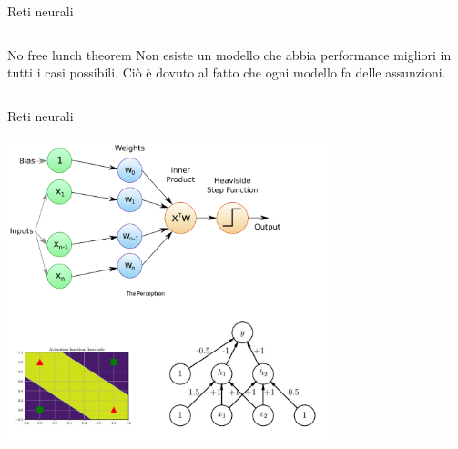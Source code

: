 \documentclass[11pt]{beamer}
\begin{document}
\begin{frame}{Reti neurali \cite{pml1Book,pml2Book,classification,regression}}
\begin{columns}
\begin{column}{0.4\textwidth}
\begin{center}
\end{center}
\begin{alertblock}{No free lunch theorem}
Non esiste un modello che abbia performance migliori in tutti i casi possibili. Ciò è dovuto al fatto che ogni modello fa delle assunzioni.
\end{alertblock}
\end{column}
\end{columns}
\end{frame}




\begin{frame}{Reti neurali \cite{pml1Book,pml2Book}}
\begin{center}
\includegraphics[width=0.7\textwidth]{Pic/perceptron.png}
\end{center}
\end{frame}
\end{document}
